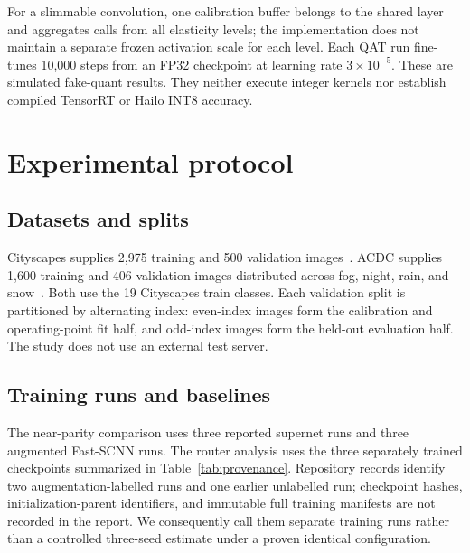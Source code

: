 \documentclass[a4paper,review,12pt]{elsarticle}
\begin{document}
For a slimmable convolution, one calibration buffer belongs to the shared layer and aggregates calls from all elasticity levels; the implementation does not maintain a separate frozen activation scale for each level. Each QAT run fine-tunes 10,000 steps from an FP32 checkpoint at learning rate $3\times10^{-5}$. These are simulated fake-quant results. They neither execute integer kernels nor establish compiled TensorRT or Hailo INT8 accuracy.

\section{Experimental protocol}
\label{sec:protocol}

\subsection{Datasets and splits}

Cityscapes supplies 2,975 training and 500 validation images~\cite{cordts2016cityscapes}. ACDC supplies 1,600 training and 406 validation images distributed across fog, night, rain, and snow~\cite{sakaridis2021acdc}. Both use the 19 Cityscapes train classes. Each validation split is partitioned by alternating index: even-index images form the calibration and operating-point fit half, and odd-index images form the held-out evaluation half. The study does not use an external test server.

\subsection{Training runs and baselines}

The near-parity comparison uses three reported supernet runs and three augmented Fast-SCNN runs. The router analysis uses the three separately trained checkpoints summarized in Table~\ref{tab:provenance}. Repository records identify two augmentation-labelled runs and one earlier unlabelled run; checkpoint hashes, initialization-parent identifiers, and immutable full training manifests are not recorded in the report. We consequently call them separate training runs rather than a controlled three-seed estimate under a proven identical configuration.
\end{document}
